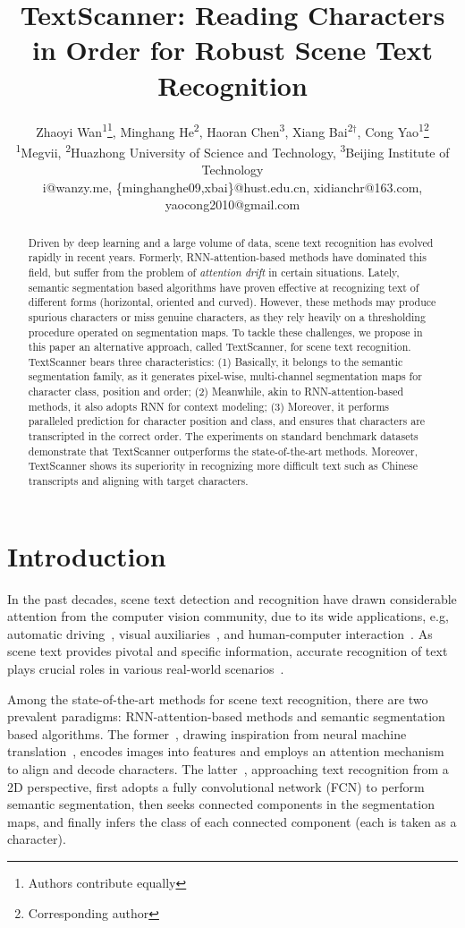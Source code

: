 \documentclass[letterpaper]{article} \usepackage{aaai20}  \usepackage{times}  \usepackage{helvet} \usepackage{courier}  \usepackage[hyphens]{url}  \usepackage{graphicx} \urlstyle{rm} \def\UrlFont{\rm}  \usepackage{graphicx}  \frenchspacing  \setlength{\pdfpagewidth}{8.5in}  \setlength{\pdfpageheight}{11in}
\title{TextScanner: Reading Characters in Order for Robust Scene Text Recognition}
\author{Zhaoyi Wan\textsuperscript{\rm 1}\footnotemark[\value{footnote}]\thanks{Authors contribute equally},
Minghang He\textsuperscript{\rm 2}\footnotemark[\value{footnote}],
Haoran Chen\textsuperscript{\rm 3},
Xiang Bai\textsuperscript{\rm 2}$^\dagger$,
Cong Yao\textsuperscript{\rm 1}\thanks{Corresponding author}\\
\textsuperscript{\rm 1}Megvii,
\textsuperscript{\rm 2}Huazhong University of Science and Technology,
\textsuperscript{\rm 3}Beijing Institute of Technology\\
i@wanzy.me, \{minghanghe09,xbai\}@hust.edu.cn, xidianchr@163.com, yaocong2010@gmail.com
}
\begin{document}
\maketitle
\begin{abstract}
Driven by deep learning and a large volume of data, scene text recognition has evolved rapidly in recent years. Formerly, RNN-attention-based methods have dominated this field, but suffer from the problem of \textit{attention drift} in certain situations. Lately, semantic segmentation based algorithms have proven effective at recognizing text of different forms (horizontal, oriented and curved). However, these methods may produce spurious characters or miss genuine characters, as they rely heavily on a thresholding procedure operated on segmentation maps. To tackle these challenges, we propose in this paper an alternative approach, called TextScanner, for scene text recognition. TextScanner bears three characteristics: (1) Basically, it belongs to the semantic segmentation family, as it generates pixel-wise, multi-channel segmentation maps for character class, position and order; (2) Meanwhile, akin to RNN-attention-based methods, it also adopts RNN for context modeling; (3) Moreover, it performs paralleled prediction for character position and class, and ensures that characters are transcripted in the correct order. The experiments on standard benchmark datasets demonstrate that TextScanner outperforms the state-of-the-art methods. Moreover, TextScanner shows its superiority in recognizing more difficult text such as Chinese transcripts and aligning with target characters.
\end{abstract}

\section{Introduction}\label{introduction}

In the past decades, scene text detection and recognition have drawn considerable attention from the computer vision community, due to its wide applications, e.g, automatic driving~\cite{ctc}, visual auxiliaries~\cite{visual_attn}, and human-computer interaction~\cite{wang2012end}. As scene text provides pivotal and specific information, accurate recognition of text plays crucial roles in various real-world scenarios~\cite{quy2013recognizing}.


Among the state-of-the-art methods for scene text recognition, there are two prevalent paradigms: RNN-attention-based methods and semantic segmentation based algorithms. The former~\cite{shi2016robust,aon}, drawing inspiration from neural machine translation~\cite{bahdanau2014neural}, encodes images into features and employs an attention mechanism to align and decode characters. The latter~\cite{mask_textspotter,ca-fcn}, approaching text recognition from a 2D perspective, first adopts a fully convolutional network (FCN) to perform semantic segmentation, then seeks connected components in the segmentation maps, and finally infers the class of each connected component (each is taken as a character).
\end{document}
